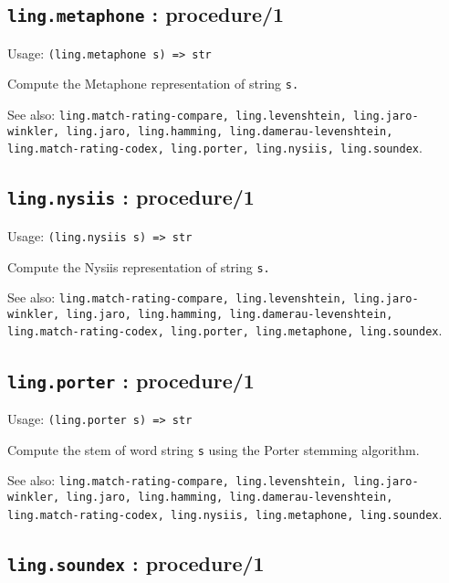 \documentclass[
]{article}
\newcommand{\passthrough}[1]{#1}
\begin{document}
\hypertarget{ling.metaphone-procedure1-1}{%
\subsection{\texorpdfstring{\texttt{ling.metaphone} :
procedure/1}{ling.metaphone : procedure/1}}\label{ling.metaphone-procedure1-1}}

Usage: \passthrough{\lstinline!(ling.metaphone s) => str!}

Compute the Metaphone representation of string
\passthrough{\lstinline!s.!}

See also:
\passthrough{\lstinline!ling.match-rating-compare, ling.levenshtein, ling.jaro-winkler, ling.jaro, ling.hamming, ling.damerau-levenshtein, ling.match-rating-codex, ling.porter, ling.nysiis, ling.soundex!}.

\hypertarget{ling.nysiis-procedure1-1}{%
\subsection{\texorpdfstring{\texttt{ling.nysiis} :
procedure/1}{ling.nysiis : procedure/1}}\label{ling.nysiis-procedure1-1}}

Usage: \passthrough{\lstinline!(ling.nysiis s) => str!}

Compute the Nysiis representation of string \passthrough{\lstinline!s.!}

See also:
\passthrough{\lstinline!ling.match-rating-compare, ling.levenshtein, ling.jaro-winkler, ling.jaro, ling.hamming, ling.damerau-levenshtein, ling.match-rating-codex, ling.porter, ling.metaphone, ling.soundex!}.

\hypertarget{ling.porter-procedure1-1}{%
\subsection{\texorpdfstring{\texttt{ling.porter} :
procedure/1}{ling.porter : procedure/1}}\label{ling.porter-procedure1-1}}

Usage: \passthrough{\lstinline!(ling.porter s) => str!}

Compute the stem of word string \passthrough{\lstinline!s!} using the
Porter stemming algorithm.

See also:
\passthrough{\lstinline!ling.match-rating-compare, ling.levenshtein, ling.jaro-winkler, ling.jaro, ling.hamming, ling.damerau-levenshtein, ling.match-rating-codex, ling.nysiis, ling.metaphone, ling.soundex!}.

\hypertarget{ling.soundex-procedure1-1}{%
\subsection{\texorpdfstring{\texttt{ling.soundex} :
procedure/1}{ling.soundex : procedure/1}}\label{ling.soundex-procedure1-1}}
\end{document}
